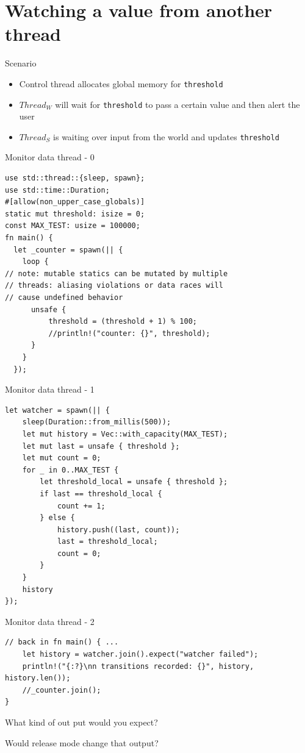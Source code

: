 \documentclass[10pt]{beamer}
\begin{document}
\section{Watching a value from another thread}

\begin{frame}{Scenario}
    \begin{itemize}
        \item Control thread allocates global memory for \texttt{threshold}
        \item $Thread_W$ will wait for \texttt{threshold} to pass a certain value and then alert the user
        \item $Thread_S$ is waiting over input from the world and updates \texttt{threshold}
    \end{itemize}
\end{frame}

\begin{frame}[fragile]{Monitor data thread - 0}
\begin{verbatim}
use std::thread::{sleep, spawn};
use std::time::Duration;
#[allow(non_upper_case_globals)]
static mut threshold: isize = 0;
const MAX_TEST: usize = 100000;
fn main() {
  let _counter = spawn(|| {
    loop {
// note: mutable statics can be mutated by multiple 
// threads: aliasing violations or data races will 
// cause undefined behavior
      unsafe {
          threshold = (threshold + 1) % 100;
          //println!("counter: {}", threshold);
      }
    }
  });
\end{verbatim}
\end{frame}

\begin{frame}[fragile]{Monitor data thread - 1}
\begin{verbatim}
let watcher = spawn(|| {
    sleep(Duration::from_millis(500));
    let mut history = Vec::with_capacity(MAX_TEST);
    let mut last = unsafe { threshold };
    let mut count = 0;
    for _ in 0..MAX_TEST {
        let threshold_local = unsafe { threshold };
        if last == threshold_local {
            count += 1;
        } else {
            history.push((last, count));
            last = threshold_local;
            count = 0;
        }
    }
    history
});

\end{verbatim}
\end{frame}

\begin{frame}[fragile]{Monitor data thread - 2}
\begin{verbatim}
// back in fn main() { ...
    let history = watcher.join().expect("watcher failed");
    println!("{:?}\nn transitions recorded: {}", history, history.len());
    //_counter.join();
}

\end{verbatim}
What kind of out put would you \alert{expect}?

Would release mode change that output?
\end{frame}
\end{document}
